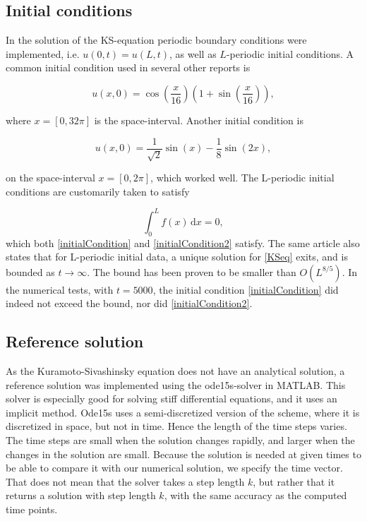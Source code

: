 \subsection{Initial conditions}
In the solution of the KS-equation periodic boundary conditions were implemented, i.e. $u(0,t) = u(L,t)$, as well as $L$-periodic initial conditions. A common initial condition used in several other reports is

\begin{equation}
\label{initialCondition}
u(x,0) = \cos(\frac{x}{16})(1 + \sin(\frac{x}{16})),
\end{equation}

where $x = [0, 32\pi]$ is the space-interval. Another initial condition is

\begin{equation}
\label{initialCondition2}
u(x,0) = \frac{1}{\sqrt{2}} \sin(x) - \frac{1}{8}\sin(2x),
\end{equation}

on the space-interval $x = [0, 2\pi]$, which worked well. The L-periodic initial conditions are customarily taken \cite{periodicInitial} to satisfy

\begin{equation}
\int_0^L\! f(x)\,\textrm{d}x = 0,
\end{equation} 
which both \eqref{initialCondition} and \eqref{initialCondition2} satisfy. The same article also states that for L-periodic initial data, a unique solution for \eqref{KSeq} exits, and is bounded as $t\rightarrow\infty$. The bound has been proven to be smaller than $O(L^{8/5})$. In the numerical tests, with $t=5000$, the initial condition \eqref{initialCondition} did indeed not exceed the bound, nor did \eqref{initialCondition2}.

\subsection{Reference solution}
As the Kuramoto-Sivashinsky equation does not have an analytical solution, a reference solution was implemented using the ode15s-solver in MATLAB. This solver is especially good for solving stiff differential equations, and it uses an implicit method. Ode15s uses a semi-discretized version of the scheme, where it is discretized in space, but not in time. Hence the length of the time steps varies. The time steps are small when the solution changes rapidly, and larger when the changes in the solution are small. Because the solution is needed at given times to be able to compare it with our numerical solution, we specify the time vector. That does not mean that the solver takes a step length $k$, but rather that it returns a solution with step length $k$, with the same accuracy as the computed time points. \cite{ode15s}


